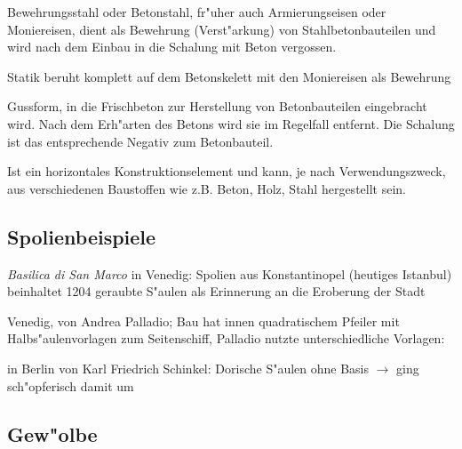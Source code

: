 \documentclass[emulatestandardclasses]{scrartcl}
\begin{document}
\begin{description}[leftmargin=!,labelwidth=\widthof{\bfseries Streifenfundament}]
  \item[Amierung] Bewehrungsstahl oder Betonstahl, fr"uher auch Armierungseisen oder Moniereisen, dient als Bewehrung (Verst"arkung) von Stahlbetonbauteilen und wird nach dem Einbau in die Schalung mit Beton vergossen.
  \item[Stahlbetonskelettbau] Statik beruht komplett auf dem Betonskelett mit den Moniereisen als Bewehrung
  \item[Schalung (Beton)] Gussform, in die Frischbeton zur Herstellung von Betonbauteilen eingebracht wird. Nach dem Erh"arten des Betons wird sie im Regelfall entfernt. Die Schalung ist das entsprechende Negativ zum Betonbauteil.
  \item[Binder] Ist ein horizontales Konstruktionselement und kann, je nach Verwendungszweck, aus verschiedenen Baustoffen wie z.B. Beton, Holz, Stahl hergestellt sein.
\end{description}

\subsection{Spolienbeispiele}

\begin{description}[leftmargin=!,labelwidth=\widthof{\bfseries San Giorgio Maggiorei}]
  \item[Markusdom] \emph{Basilica di San Marco} in Venedig: Spolien aus Konstantinopel (heutiges Istanbul) beinhaltet 1204 geraubte S"aulen als Erinnerung an die Eroberung der Stadt
  \item[San Giorgio Maggiore] Venedig, von Andrea Palladio; Bau hat innen quadratischem Pfeiler mit Halbs"aulenvorlagen zum Seitenschiff, Palladio nutzte unterschiedliche Vorlagen:
  \item[Neue Wache] in Berlin von Karl Friedrich Schinkel: Dorische S"aulen ohne Basis $\rightarrow$ ging sch"opferisch damit um
\end{description}


\subsection{Gew"olbe}
\end{document}
